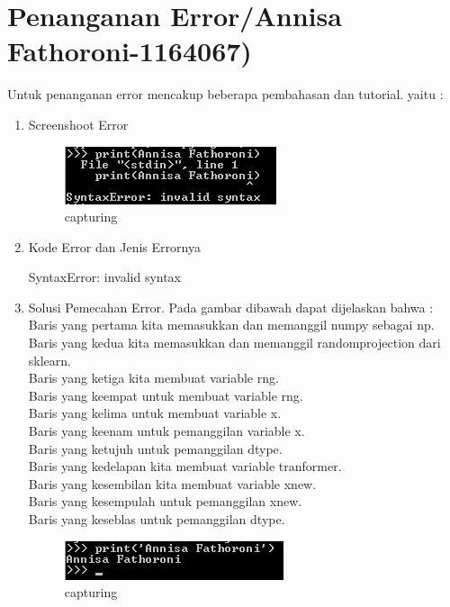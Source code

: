 \section{Penanganan Error/Annisa Fathoroni-1164067)}
Untuk penanganan error mencakup beberapa pembahasan dan tutorial. yaitu :
\begin{enumerate}
\item Screenshoot Error

\begin{figure}[ht]
\centering
\includegraphics[scale=0.5]{figures/Capture8.png}
\caption{capturing}
\label{loading an example dataset}
\end{figure}

\item Kode Error dan Jenis Errornya

SyntaxError: invalid syntax

\item Solusi Pemecahan Error.
Pada gambar dibawah dapat dijelaskan bahwa :\\
Baris yang pertama kita memasukkan dan memanggil numpy sebagai np.\\
Baris yang kedua kita memasukkan dan memanggil randomprojection dari sklearn.\\
Baris yang ketiga kita  membuat variable rng.\\
Baris yang keempat untuk  membuat variable rng.\\
Baris yang kelima untuk  membuat variable x.\\
Baris yang keenam untuk  pemanggilan variable x.\\
Baris yang ketujuh untuk pemanggilan dtype.\\
Baris yang kedelapan kita membuat variable tranformer.\\
Baris yang kesembilan kita membuat variable xnew.\\
Baris yang kesempulah untuk  pemanggilan xnew.\\
Baris yang keseblas untuk  pemanggilan dtype.
\begin{figure}[ht]
\centering
\includegraphics[scale=0.5]{figures/Capture9.png}
\caption{capturing}
\label{loading an example dataset}
\end{figure}


\end{enumerate}